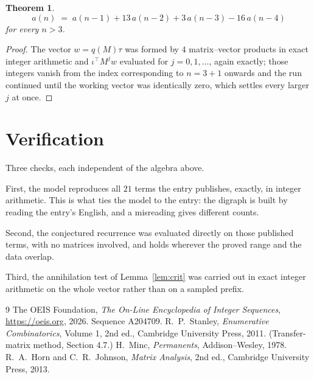 \documentclass[11pt,a4paper]{article}
\theoremstyle{plain}
\newtheorem{theorem}{Theorem}
\theoremstyle{definition}
\begin{document}
\begin{theorem}
\[
a(n)\;=\;a(n-1) + 13\,a(n-2) + 3\,a(n-3) - 16\,a(n-4)
\]
for every $n>3$.
\end{theorem}

\begin{proof}
The vector $w=q(M)\tau$ was formed by $4$ matrix--vector products in exact integer
arithmetic and $\iota^{\!\top}M^{j}w$ evaluated for $j=0,1,\dots$, again exactly; those
integers vanish from the index corresponding to $n=3+1$ onwards and the run continued
until the working vector was identically zero, which settles every larger $j$ at once.
\end{proof}

\section{Verification}

Three checks, each independent of the algebra above.

First, the model reproduces all $21$ terms the entry publishes, exactly, in integer
arithmetic. This is what ties the model to the entry: the digraph is built by reading the
entry's English, and a misreading gives different counts.

Second, the conjectured recurrence was evaluated directly on those published terms, with no
matrices involved, and holds wherever the proved range and the data overlap.

Third, the annihilation test of Lemma~\ref{lem:crit} was carried out in exact integer
arithmetic on the whole vector rather than on a sampled prefix.

\begin{thebibliography}{9}
 The OEIS Foundation, \emph{The On-Line Encyclopedia of Integer
Sequences}, \url{https://oeis.org}, 2026. Sequence A204709.
 R.~P.~Stanley, \emph{Enumerative Combinatorics}, Volume 1, 2nd ed.,
Cambridge University Press, 2011. (Transfer-matrix method, Section 4.7.)
 H.~Minc, \emph{Permanents}, Addison--Wesley, 1978.
 R.~A.~Horn and C.~R.~Johnson, \emph{Matrix Analysis}, 2nd ed., Cambridge
University Press, 2013.
\end{thebibliography}
\end{document}

